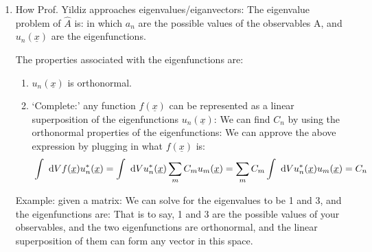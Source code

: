 \documentclass{school-22.101-notes}
\begin{document}
\begin{enumerate}
\item How Prof. Yildiz approaches eigenvalues/eiganvectors:  The eigenvalue problem of $\hat{A}$ is:
in which $a_n$ are the possible values of the observables A, and $u_n(\underline{x})$ are the eigenfunctions. 

The properties associated with the eigenfunctions are: 
\begin{enumerate}
\item $u_n(\underline{x})$ is orthonormal. 

\item `Complete:' any function $f(\underline{x})$ can be represented as a linear superposition of the eigenfunctions $u_n(\underline{x})$:
  We can find $C_n$ by using the orthonormal properties of the eigenfunctions:
  We can approve the above expression by plugging in what $f(\underline{x})$ is:
  \begin{align}
    & \int \mbox{ }\mathrm{d} V f(\underline{x}) u_n^* (\underline{x}) = \int \mbox{ }\mathrm{d} V  u_n^* (\underline{x}) \displaystyle\sum_m C_m u_m(\underline{x}) = \displaystyle\sum_m C_m \int \mbox{ }\mathrm{d} V u_n^*(\underline{x}) u_m (\underline{x}) = C_n
  \end{align}
\end{enumerate}

Example: given a matrix:
We can solve for the eigenvalues to be 1 and 3, and the eigenfunctions are:
That is to say, 1 and 3 are the possible values of your observables, and the two eigenfunctions are orthonormal, and the linear superposition of them can form any vector in this space.
\end{enumerate}
\end{document}
